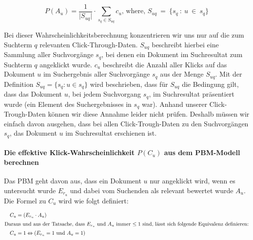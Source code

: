 \vspace{-1.5em}
\begin{equation}	
	P(A_{u}) = \frac{1}{\vert S_{uq} \vert} \cdot \sum\limits_{s_q \in S_{uq}}{c_{u}\text{, where, } S_{uq}\ =\ \lbrace s_q\ :\ u\ \in\ s_q \rbrace}
\end{equation}
\vspace{-1em}

Bei dieser Wahrscheinlichkeitsberechnung konzentrieren wir uns nur auf die zum Suchterm $q$ relevanten Click-Through-Daten. $S_{uq}$ beschreibt hierbei eine Sammlung aller Suchvorgänge $s_q$, bei denen ein Dokument im Suchresultat zum Suchterm $q$ angeklickt wurde. $c_{u}$ beschreibt die Anzahl aller Klicks auf das Dokument $u$ im Suchergebnis aller Suchvorgänge $s_q$ aus der Menge $S_{uq}$. Mit der Definition $S_{uq} = \lbrace s_q : u \in s_q \rbrace$ wird beschrieben, dass für $S_{uq}$ die Bedingung gilt, dass das Dokument $u$, bei jedem Suchvorgang $s_q$, im Suchresultat präsentiert wurde (ein Element des Suchergebnisses in $s_q$ war). Anhand unserer Click-Trough-Daten können wir diese Annahme leider nicht prüfen. Deshalb müssen wir einfach davon ausgehen, dass bei allen Click-Trough-Daten zu den Suchvorgängen $s_q$, das Dokument $u$ im Suchresultat erschienen ist. 

\paragraph{Die effektive Klick-Wahrscheinlichkeit $P(C_{u})$ aus dem PBM-Modell berechnen}
Das PBM geht davon aus, dass ein Dokument $u$ nur angeklickt wird, wenn es untersucht wurde $E_{r_{u}}$ und dabei vom Suchenden als relevant bewertet wurde $A_{u}$. Die Formel zu $C_{u}$ wird wie folgt definiert:

\vspace{-2em}
\begin{spacing}{1}
\begin{align}
	&&	C_{u} &= \left(E_{r_{u}} \cdot A_{u}\right) &\\
  \intertext{Daraus und aus der Tatsache, dass $E_{r_{u}}$ und $A_{u}$ immer $\leq 1$ sind, lässt sich folgende Equivalenz definieren:}
  &&	C_{u} &= 1\Leftrightarrow \left(E_{r_{u}} = 1 \text{ und } A_{u} = 1\right)
\end{align}
\end{spacing}
\vspace{-1em}


